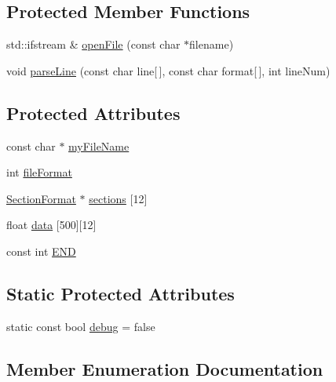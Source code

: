 \subsection*{Protected Member Functions}
\begin{DoxyCompactItemize}
\item 
std\+::ifstream \& \hyperlink{classsvl_c_c_file_i_o_ad1912b57d81be543cd69a6c2c1278cd4}{open\+File} (const char $\ast$filename)
\item 
void \hyperlink{classsvl_c_c_file_i_o_a1892391e2070499d161f10dd92a77132}{parse\+Line} (const char line\mbox{[}$\,$\mbox{]}, const char format\mbox{[}$\,$\mbox{]}, int line\+Num)
\end{DoxyCompactItemize}
\subsection*{Protected Attributes}
\begin{DoxyCompactItemize}
\item 
const char $\ast$ \hyperlink{classsvl_c_c_file_i_o_a35c21bfeb403f11edeaa3cfe840bc131}{my\+File\+Name}
\item 
int \hyperlink{classsvl_c_c_file_i_o_a909643473f103610ef3e3c2f6cc8ab36}{file\+Format}
\item 
\hyperlink{classsvl_c_c_file_i_o_1_1_section_format}{Section\+Format} $\ast$ \hyperlink{classsvl_c_c_file_i_o_a23a716f9d66619a4d6dd8bca942a10e0}{sections} \mbox{[}12\mbox{]}
\item 
float \hyperlink{classsvl_c_c_file_i_o_ae844c345ae4a600c08c10a4f0bfe19db}{data} \mbox{[}500\mbox{]}\mbox{[}12\mbox{]}
\item 
const int \hyperlink{classsvl_c_c_file_i_o_a1684202309d50da31b40dbba082117ff}{E\+N\+D}
\end{DoxyCompactItemize}
\subsection*{Static Protected Attributes}
\begin{DoxyCompactItemize}
\item 
static const bool \hyperlink{classsvl_c_c_file_i_o_ad0cf392aff766cccdce3cdc84bd7fd0e}{debug} = false
\end{DoxyCompactItemize}


\subsection{Member Enumeration Documentation}
\hypertarget{classsvl_c_c_file_i_o_a611d26ef01a82b0e1712aacd0994dfca}{}
